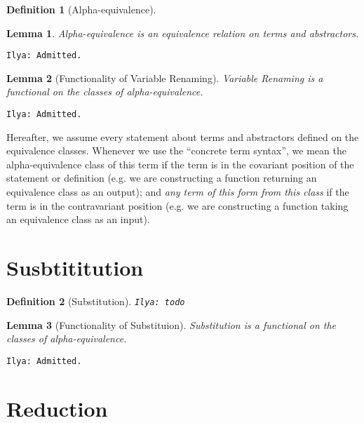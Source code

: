 \documentclass[a4,natbib=false]{article}
\newtheorem{lemma}{Lemma}
\newtheorem{definition}{Definition}
\newcommand{\ilyam}[1]{{\color{red} \texttt{Ilya:  #1}}}
\newcommand{\rename}[3]{{#1}\{{#2}\rightsquigarrow{#3}\}}
\newcommand{\narg}[1]{|{#1}|}
\newcommand{\judgealpha}[2]{{#1} \sim_{\alpha} {#2}}
\newcommand{\fullterm}[2]{{#1}\,#2_1 \dots #2_{\narg{#1}}}
\newcommand{\Infer}[3]{\inferrule*[right={#1}]{#2}{#3}}
\begin{document}
\begin{definition}[Alpha-equivalence]

\end{definition}

\begin{lemma}
  Alpha-equivalence is an equivalence relation on terms and abstractors.
\end{lemma}
\ilyam{Admitted.}

\begin{lemma}[Functionality of Variable Renaming]
  Variable Renaming is a functional on the classes of alpha-equivalence.
\end{lemma}
\ilyam{Admitted.}

Hereafter, we assume every statement about terms and abstractors defined on the
equivalence classes. Whenever we use the ``concrete term syntax'', we mean the
alpha-equivalence class of this term if the term is in the covariant position of
the statement or definition (e.g. we are constructing a function returning an
equivalence class as an output); and \emph{any term of this form from this
  class} if the term is in the contravariant position (e.g. we are constructing
a function taking an equivalence class as an input).


\section{Susbtititution}
\begin{definition}[Substitution]
  \ilyam{todo}
\end{definition}

\begin{lemma}[Functionality of Substituion]
  Substitution is a functional on the classes of alpha-equivalence.
\end{lemma}
\ilyam{Admitted.}


\section{Reduction}
\end{document}
